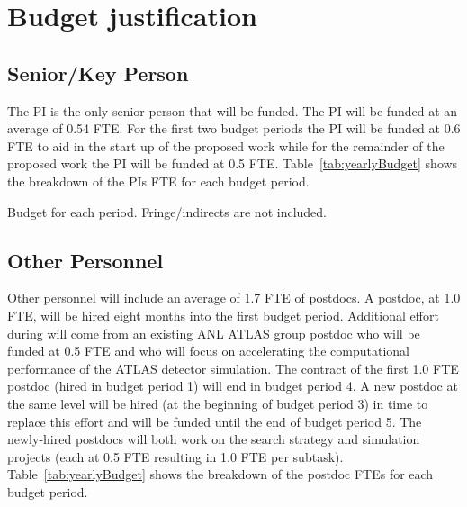 \documentclass[letter, USenglish, 11pt, subfigure]{article}
\title{}
\author{Walter Hopkins, Assistant Physicist\\
}
\date{}
\begin{document}

\maketitle

\section{Budget justification}

\subsection{Senior/Key Person}
\label{subsec:keyPerson}
The PI is the only senior person that will be funded. The PI will be funded at an average of 0.54 FTE. For the first two budget periods the PI will be funded at 0.6 FTE to aid in the start up of the proposed work while for the remainder of the proposed work the PI will be funded at 0.5 FTE. Table~\ref{tab:yearlyBudget} shows the breakdown of the PIs FTE for each budget period.

\begin{table}[!htpb]
  \begin{center}
    \caption{Budget for each period. Fringe/indirects are not included.}
      \label{tab:yearlyBudget}
  
  \end{center}
\end{table}

\subsection{Other Personnel}
\label{subsec:personnel}
Other personnel will include an average of 1.7 FTE of postdocs. A postdoc, at 1.0 FTE, will be hired eight months into the first budget period. Additional effort during will come from an existing ANL ATLAS group postdoc who will be funded at 0.5 FTE and who will focus on accelerating the computational performance of the ATLAS detector simulation. The contract of the first 1.0 FTE postdoc (hired in budget period 1) will end in budget period 4. A new postdoc at the same level will be hired (at the beginning of budget period 3) in time to replace this effort and will be funded until the end of budget period 5. The newly-hired postdocs will both work on the search strategy and simulation projects (each at 0.5 FTE resulting in 1.0 FTE per subtask). Table~\ref{tab:yearlyBudget} shows the breakdown of the postdoc FTEs for each budget period.
\clearpage
\end{document}
